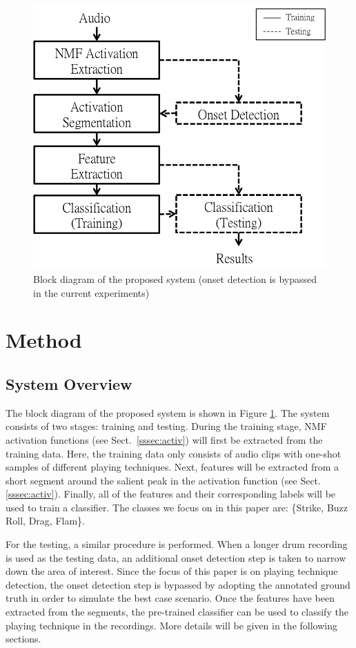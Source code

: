 \documentclass{article}
\begin{document}

\begin{figure}
\centering
\includegraphics[width = 7 cm]{./figures/block_diagram.png}
\caption{Block diagram of the proposed system {\color{red}(onset detection is bypassed in the current experiments)}}
\label{fig:block}
\end{figure}

\section{Method}\label{sec:method}
\subsection{System Overview}\label{ssec:overview}

The block diagram of the proposed system is shown in Figure \ref{fig:block}. The system consists of two stages: training and testing. During the training stage, NMF activation functions (see Sect.~\ref{sssec:activ}) will first be extracted from the training data. Here, the training data only consists of audio clips with one-shot samples of different playing techniques. Next, features will be extracted from a short segment around the salient peak in the activation function (see Sect. \ref{sssec:activ}). Finally, all of the features and their corresponding labels will be used to train a classifier. The classes we focus on in this paper are: \{Strike, Buzz Roll, Drag, Flam\}. 

For the testing, a similar procedure is performed. When a longer drum recording is used as the testing data, an additional onset detection step is taken to narrow down the area of interest. %
Since the focus of this paper is on playing technique detection, the onset detection step is bypassed by adopting the annotated ground truth in order to simulate the best case scenario. Once the features have been extracted from the segments, the pre-trained classifier can be used to classify the playing technique in the recordings. More details will be given in the following sections. 
 
\end{document}
